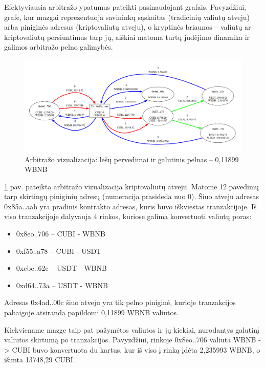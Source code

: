 \documentclass{VUMIFPSkursinis}
\begin{document}
Efektyviausia arbitražo ypatumus pateikti pasinaudojant grafais. Pavyzdžiui, grafe, kur mazgai reprezentuoja savininkų sąskaitas (tradicinių valiutų atveju) arba piniginės adresus (kriptovaliutų atveju), o kryptinės briaunos – valiutų ar kriptovaliutų persiuntimus tarp jų, aiškiai matoma turtų judėjimo dinamika ir galimos arbitražo pelno galimybės. 

\begin{figure}[H]
    \centering
    \includegraphics[scale=0.3]{img/arb1.png}
    \caption{Arbitražo vizualizacija: lėšų pervedimai ir galutinis pelnas – 0,11899 WBNB}
    \label{img:chess-minimax-2}
\end{figure} 

\ref{img:chess-minimax-2} pav. pateikta arbitražo vizualizacija kriptovaliutų atveju. Matome 12 pavedimų tarp skirtingų piniginių adresų (numeracija prasideda nuo 0). Šiuo atveju adresas 0x85a..aab yra pradinis kontrakto adresas, kuris buvo iškviestas tranzakcijoje. Iš viso tranzakcijoje dalyvauja 4 rinkos, kuriose galima konvertuoti valiutų poras:

\begin{itemize}
    \item 0x8eo..706 -- CUBI - WBNB
    \item 0xf55..a78 -- CUBI - USDT
    \item 0xcbc..62c -- USDT - WBNB
    \item 0xd64..73a -- USDT - WBNB
\end{itemize}

Adresas 0x4ad..00c šiuo atveju yra tik pelno piniginė, kurioje tranzakcijos pabaigoje atsiranda papildomi 0,11899 WBNB valiutos.

Kiekviename mazge taip pat pažymėtos valiutos ir jų kiekiai, nurodantys galutinį valiutos skirtumą po tranzakcijos. Pavyzdžiui, rinkoje 0x8eo..706 valiuta WBNB -> CUBI buvo konvertuota du kartus, kur iš viso į rinką įdėta 2,235993 WBNB, o išimta 13748,29 CUBI.
\end{document}
